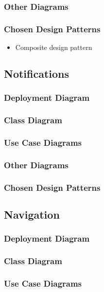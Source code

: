 \documentclass{article}
\begin{document}
        \subsubsection{Other Diagrams}
        \subsubsection{Chosen Design Patterns}
        \begin{itemize}
        \item Composite design pattern
        \end{itemize}
    \subsection{Notifications}
        \subsubsection{Deployment Diagram}
        \subsubsection{Class Diagram}
        \subsubsection{Use Case Diagrams}
        \subsubsection{Other Diagrams}
        \subsubsection{Chosen Design Patterns}
    \subsection{Navigation}
        \subsubsection{Deployment Diagram}
        \subsubsection{Class Diagram}
        \subsubsection{Use Case Diagrams}
\end{document}
